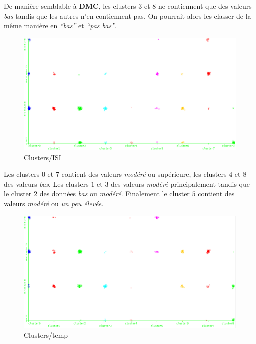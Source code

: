 \documentclass{article}
\begin{document}
\begin{sffamily}
De manière semblable à \textbf{DMC}, les clusters $3$ et $8$ ne contiennent que des valeurs \textit{bas} tandis que les autres n'en contiennent pas. 
On pourrait alors les classer de la même manière en \textit{``bas''} et \textit{``pas bas''}.
\newpage
\begin{figure}[h!]
    \begin{center}
    \includegraphics[width=\textwidth]{img_012.pdf}
    \caption{Clusters/ISI}
    \end{center}	
\end{figure}

Les clusters $0$ et $7$ contient des valeurs \textit{modéré} ou supérieure, les clusters $4$ et $8$ des valeurs \textit{bas}. Les clusters $1$ et $3$ 
des valeurs \textit{modéré} principalement tandis que le cluster $2$ des données \textit{bas} ou \textit{modéré}. Finalement le cluster $5$ contient 
des valeurs \textit{modéré} ou \textit{un peu élevée}.

\begin{figure}[h!]
    \begin{center}
    \includegraphics[width=\textwidth]{img_013.pdf}
    \caption{Clusters/temp}
    \end{center}	
\end{figure}


\end{sffamily}
\end{document}
